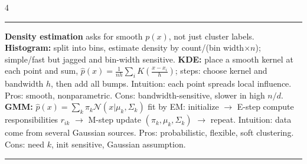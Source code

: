 \documentclass[6.5pt,landscape]{article}
\newcommand{\rl}{\vspace{-1.5pt}\par\noindent\rule{\columnwidth}{0.15pt}\par\vspace{-1pt}}
\newcommand{\sectionrule}{\vspace{-1pt}\par\noindent\rule{\columnwidth}{0.4pt}\par\vspace{-2pt}}
\begin{document}
\begin{multicols*}{4}
\rl
\noindent\textbf{Density estimation} asks for smooth $p(x)$, not just cluster labels. \textbf{Histogram:} split into bins, estimate density by count/(bin width$\times n$); simple/fast but jagged and bin-width sensitive. \textbf{KDE:} place a smooth kernel at each point and sum, $\hat p(x)=\frac{1}{nh}\sum_i K\!\left(\frac{x-x_i}{h}\right)$; steps: choose kernel and bandwidth $h$, then add all bumps. Intuition: each point spreads local influence. Pros: smooth, nonparametric. Cons: bandwidth-sensitive, slower in high $n/d$. \textbf{GMM:} $\hat p(x)=\sum_k\pi_k\mathcal{N}(x|\mu_k,\Sigma_k)$ fit by EM: initialize $\to$ E-step compute responsibilities $r_{ik}$ $\to$ M-step update $(\pi_k,\mu_k,\Sigma_k)$ $\to$ repeat. Intuition: data come from several Gaussian sources. Pros: probabilistic, flexible, soft clustering. Cons: need $k$, init sensitive, Gaussian assumption.\par
\sectionrule

\end{multicols*}
\end{document}
